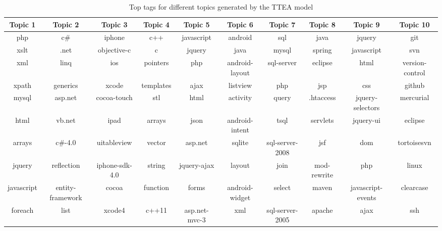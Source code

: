 {{{{{{{\begin{sidewaystable}
\caption{Top tags for different topics generated by the TTEA model}
\label{tab:toptagsp}
\centering
\scriptsize
\begin{tabular}{cccccccccc}
\hline
Topic 1& Topic 2& Topic 3& Topic 4 & Topic 5 & Topic 6& Topic 7 & Topic 8 &Topic 9 & Topic 10\\
\hline
php&c#&iphone&c++&javascript&android&sql&java&jquery&git \\ 
xslt&.net&objective-c&c&jquery&java&mysql&spring&javascript&svn \\ 
xml&linq&ios&pointers&php&android-layout&sql-server&eclipse&html&version-control \\ 
xpath&generics&xcode&templates&ajax&listview&php&jsp&css&github \\ 
mysql&asp.net&cocoa-touch&stl&html&activity&query&.htaccess&jquery-selectors&mercurial \\ 
html&vb.net&ipad&arrays&json&android-intent&tsql&servlets&jquery-ui&eclipse \\ 
arrays&c#-4.0&uitableview&vector&asp.net&sqlite&sql-server-2008&jsf&dom&tortoisesvn \\ 
jquery&reflection&iphone-sdk-4.0&string&jquery-ajax&layout&join&mod-rewrite&php&linux \\ 
javascript&entity-framework&cocoa&function&forms&android-widget&select&maven&javascript-events&clearcase \\ 
foreach&list&xcode4&c++11&asp.net-mvc-3&xml&sql-server-2005&apache&ajax&ssh \\
\hline
\end{tabular}
\end{sidewaystable}

}}}}}}}

